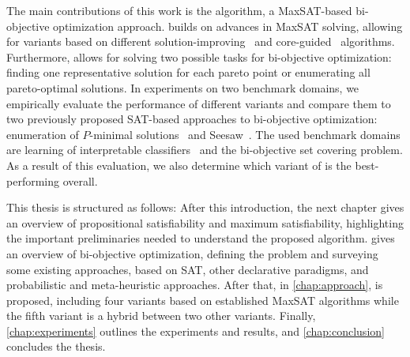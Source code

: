 The main contributions of this work is the \algname{} algorithm, a MaxSAT-based bi-objective optimization approach.
\algname{} builds on advances in MaxSAT solving, allowing for variants based on different solution-improving~\autocite{handbook2-maxsat,DBLP:journals/jsat/BerreP10,DBLP:journals/jsat/EenS06} and core-guided~\autocite{DBLP:journals/corr/abs-0712-1097,DBLP:conf/sat/AnsoteguiBL09,DBLP:conf/cp/MorgadoDM14,DBLP:journals/jsat/IgnatievMM19} algorithms.
Furthermore, \algname{} allows for solving two possible tasks for bi-objective optimization: finding one representative solution for each pareto point or enumerating all pareto-optimal solutions.
In experiments on two benchmark domains, we empirically evaluate the performance of different \algname{} variants and compare them to two previously proposed SAT-based approaches to bi-objective optimization: enumeration of $P$-minimal solutions~\autocite{DBLP:conf/cp/SohBTB17} and Seesaw~\autocite{DBLP:conf/cp/JanotaMSM21}.
The used benchmark domains are learning of interpretable classifiers~\autocite{DBLP:conf/cp/MaliotovM18} and the bi-objective set covering problem.
As a result of this evaluation, we also determine which variant of \algname{} is the best-performing overall.

This thesis is structured as follows:
After this introduction, the next chapter gives an overview of propositional satisfiability and maximum satisfiability, highlighting the important preliminaries needed to understand the proposed algorithm.
 gives an overview of bi-objective optimization, defining the problem and surveying some existing approaches, based on SAT, other declarative paradigms, and probabilistic and meta-heuristic approaches.
After that, in \cref{chap:approach}, \algname{} is proposed, including four variants based on established MaxSAT algorithms while the fifth variant is a hybrid between two other variants.
Finally, \cref{chap:experiments} outlines the experiments and results, and \cref{chap:conclusion} concludes the thesis.
